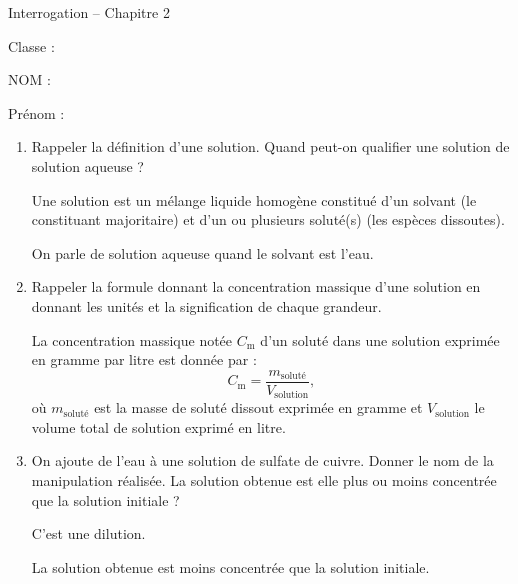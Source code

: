 
\cfoot{} %
\usepackage{setspace}

\newcommand{\Hsquare}{%
  \text{\fboxsep=-.2pt\fbox{\rule{0pt}{1ex}\rule{1ex}{0pt}}}%
}



\begin{header}
Interrogation -- Chapitre 2

\normalsize
\flushleft
\begin{doublespace}
Classe :

NOM :

\end{doublespace}
Prénom :
\end{header}

\begin{enumerate}
\item Rappeler la définition d'une solution.
Quand peut-on qualifier une solution de solution aqueuse ?

{\color{bleu_f}
Une solution est un mélange liquide homogène constitué d'un solvant (le constituant majoritaire) et d'un ou plusieurs soluté(s) (les espèces dissoutes).

On parle de solution aqueuse quand le solvant est l'eau.
}
\vfill

\item Rappeler la formule donnant la concentration massique d'une solution en donnant les unités et la signification de chaque grandeur.

{\color{bleu_f}
La concentration massique notée $C_\mathrm{m}$ d'un soluté dans une solution exprimée en gramme par litre est donnée par :
\begin{equation}
C_\mathrm{m} = \frac{m_\mathrm{soluté}}{V_\mathrm{solution}},
\nonumber
\end{equation}
où $m_\mathrm{soluté}$ est la masse de soluté dissout exprimée en gramme et $V_\mathrm{solution}$ le volume total de solution exprimé en litre.
}
\vfill

\item On ajoute de l'eau à une solution de sulfate de cuivre.
Donner le nom de la manipulation réalisée.
La solution obtenue est elle plus ou moins concentrée que la solution initiale ?

{\color{bleu_f}
C'est une dilution.

La solution obtenue est moins concentrée que la solution initiale.
}
\vfill


\end{enumerate}
